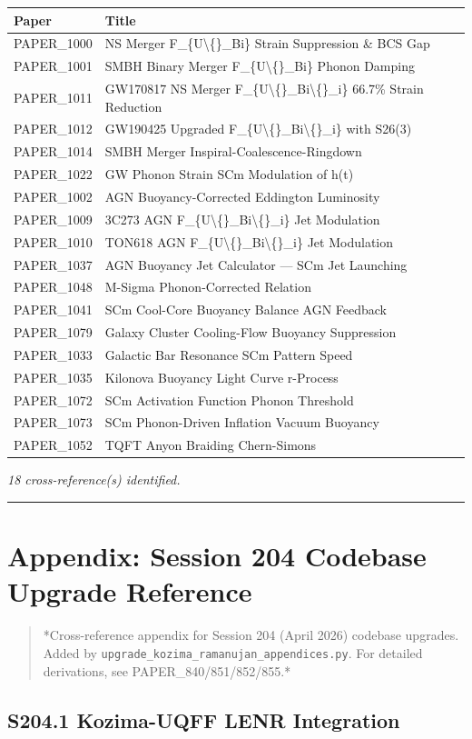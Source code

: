 \documentclass[11pt]{article}
\begin{document}
\begin{center}
\begin{longtable}{ll}
\toprule
Paper & Title \tabularnewline
\midrule
\endhead
PAPER\_1000 & NS Merger F\_\{U\textbackslash\{\}\_Bi\} Strain Suppression \& BCS Gap \tabularnewline
PAPER\_1001 & SMBH Binary Merger F\_\{U\textbackslash\{\}\_Bi\} Phonon Damping \tabularnewline
PAPER\_1011 & GW170817 NS Merger F\_\{U\textbackslash\{\}\_Bi\textbackslash\{\}\_i\} 66.7\% Strain Reduction \tabularnewline
PAPER\_1012 & GW190425 Upgraded F\_\{U\textbackslash\{\}\_Bi\textbackslash\{\}\_i\} with S26(3) \tabularnewline
PAPER\_1014 & SMBH Merger Inspiral-Coalescence-Ringdown \tabularnewline
PAPER\_1022 & GW Phonon Strain SCm Modulation of h(t) \tabularnewline
PAPER\_1002 & AGN Buoyancy-Corrected Eddington Luminosity \tabularnewline
PAPER\_1009 & 3C273 AGN F\_\{U\textbackslash\{\}\_Bi\textbackslash\{\}\_i\} Jet Modulation \tabularnewline
PAPER\_1010 & TON618 AGN F\_\{U\textbackslash\{\}\_Bi\textbackslash\{\}\_i\} Jet Modulation \tabularnewline
PAPER\_1037 & AGN Buoyancy Jet Calculator --- SCm Jet Launching \tabularnewline
PAPER\_1048 & M-Sigma Phonon-Corrected Relation \tabularnewline
PAPER\_1041 & SCm Cool-Core Buoyancy Balance AGN Feedback \tabularnewline
PAPER\_1079 & Galaxy Cluster Cooling-Flow Buoyancy Suppression \tabularnewline
PAPER\_1033 & Galactic Bar Resonance SCm Pattern Speed \tabularnewline
PAPER\_1035 & Kilonova Buoyancy Light Curve r-Process \tabularnewline
PAPER\_1072 & SCm Activation Function Phonon Threshold \tabularnewline
PAPER\_1073 & SCm Phonon-Driven Inflation Vacuum Buoyancy \tabularnewline
PAPER\_1052 & TQFT Anyon Braiding Chern-Simons \tabularnewline
\bottomrule
\end{longtable}
\end{center}

\emph{18 cross-reference(s) identified.}

\noindent\rule{\textwidth}{0.4pt}

\section*{Appendix: Session 204 Codebase Upgrade Reference}

\begin{quote}
*Cross-reference appendix for Session 204 (April 2026) codebase upgrades.
Added by \verb|upgrade_kozima_ramanujan_appendices.py|. For detailed derivations,
see PAPER\_840/851/852/855.*
\end{quote}

\subsection*{S204.1 Kozima-UQFF LENR Integration}
\end{document}
